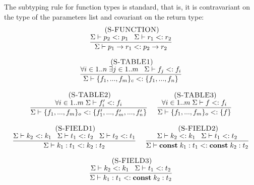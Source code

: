 The subtyping rule for function types is standard, that is, it is
contravariant on the type of the parameters list and
covariant on the return type:
\[
\begin{array}{c}
\; (\textsc{S-FUNCTION})\\
\dfrac{\Sigma \vdash p_{2} <: p_{1} \;\;\;
       \Sigma \vdash r_{1} <: r_{2}}
      {\Sigma \vdash p_{1} \rightarrow r_{1} <: p_{2} \rightarrow r_{2}}
\end{array}
\]

\[
\begin{array}{c}
\begin{array}{c}
\; (\textsc{S-TABLE1})\\
\dfrac{\forall i \in 1..n \; \exists j \in 1..m \;\;\;
       \Sigma \vdash f_{j} <: f_{i}}
      {\Sigma \vdash \{f_{1}, ..., f_{m}\}_{c} <: \{f_{1}, ..., f_{n}\}}
\end{array}
\\ \\
\begin{array}{c}
\; (\textsc{S-TABLE2})\\
\dfrac{\forall i \in 1..m \; \Sigma \vdash f_{i}' <: f_{i}}
      {\Sigma \vdash \{f_{1}, ..., f_{m}\}_{o} <: \{f_{1}', ..., f_{m}', ..., f_{n}'\}}
\end{array}
\;
\begin{array}{c}
\; (\textsc{S-TABLE3})\\
\dfrac{\forall i \in 1..m \; \Sigma \vdash f <: f_{i}}
      {\Sigma \vdash \{f_{1}, ..., f_{m}\}_{o} <: \{f\}} 
\end{array}
\\ \\
\begin{array}{c}
\; (\textsc{S-FIELD1})\\
\dfrac{\Sigma \vdash k_{2} <: k_{1} \;\;\;
       \Sigma \vdash t_{1} <: t_{2} \;\;\;
       \Sigma \vdash t_{2} <: t_{1}}
      {\Sigma \vdash k_{1}:t_{1} <: k_{2}:t_{2}}
\end{array}
\;
\begin{array}{c}
\; (\textsc{S-FIELD2})\\
\dfrac{\Sigma \vdash k_{2} <: k_{1} \;\;\;
       \Sigma \vdash t_{1} <: t_{2}}
      {\Sigma \vdash \mathbf{const} \; k_{1}:t_{1} <: \mathbf{const} \; k_{2}:t_{2}}
\end{array}
\\ \\
\begin{array}{c}
\; (\textsc{S-FIELD3})\\
\dfrac{\Sigma \vdash k_{2} <: k_{1} \;\;\;
       \Sigma \vdash t_{1} <: t_{2}}
      {\Sigma \vdash k_{1}:t_{1} <: \mathbf{const} \; k_{2}:t_{2}}
\end{array}
\end{array}
\]

